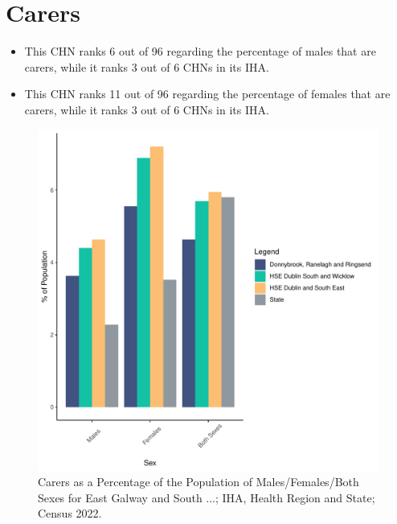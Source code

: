 \documentclass{article}
\begin{document}
\section{Carers}\label{sect:Carers}
\begin{itemize}
\item This CHN ranks  6 out of 96 regarding the percentage of males that are carers, while it ranks   3 out of 6 CHNs in its IHA.
\item This CHN ranks  11 out of 96 regarding the percentage of females that are carers, while it ranks   3 out of 6 CHNs in its IHA.
\end{itemize}
\begin{figure}[H]
	\centering
	\includegraphics[width = 150mm]{../figures/CareED.pdf}
	\caption{Carers as a Percentage of the Population of Males/Females/Both Sexes for East Galway and South ...; IHA, Health Region and State; Census 2022.}
	\label{fig:2ae19629-1a6a-13a3-e055-000000000001}
	\end{figure}
\end{document}
